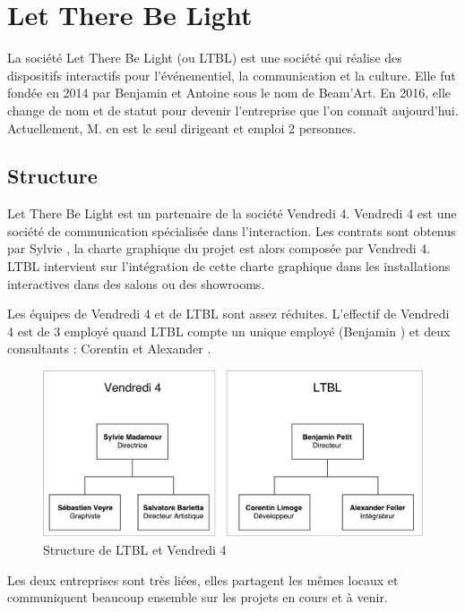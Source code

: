 \section{Let There Be Light}

La société Let There Be Light (ou LTBL) est une société qui réalise des dispositifs interactifs pour l'événementiel, la communication et la culture.
Elle fut fondée en 2014 par Benjamin  et Antoine  sous le nom de Beam'Art.
En 2016, elle change de nom et de statut pour devenir l'entreprise que l'on connaît aujourd'hui.
Actuellement, M.  en est le seul dirigeant et emploi 2 personnes.

\subsection{Structure}

Let There Be Light est un partenaire de la société Vendredi 4.
Vendredi 4 est une société de communication spécialisée dans l'interaction.
Les contrats sont obtenus par Sylvie , la charte graphique du projet est alors composée par Vendredi 4.
LTBL intervient sur l'intégration de cette charte graphique dans les installations interactives dans des salons ou des showrooms.

Les équipes de Vendredi 4 et de LTBL sont assez réduites.
L'effectif de Vendredi 4 est de 3 employé quand LTBL compte un unique employé (Benjamin ) et deux consultants : Corentin  et Alexander .

\begin{figure}[h]
    \centering
    \includegraphics[scale=0.7]{img/Structure-LTBL.pdf}
    \caption{Structure de LTBL et Vendredi 4}
\end{figure}

Les deux entreprises sont très liées, elles partagent les mêmes locaux et communiquent beaucoup ensemble sur les projets en cours et à venir.


